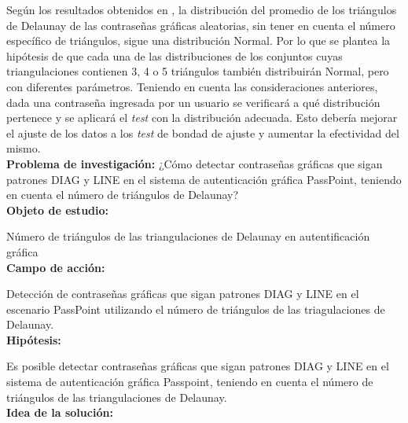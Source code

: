 \documentclass[12pt]{report}
\begin{document}
	
	Según los resultados obtenidos en \cite{13}, la distribución del promedio de los triángulos de  Delaunay de las contraseñas gráficas aleatorias, sin tener en cuenta el número específico de triángulos, sigue una distribución Normal. Por lo que se plantea la hipótesis de que cada una de las distribuciones de los conjuntos cuyas triangulaciones contienen 3, 4 o 5 triángulos también distribuirán Normal, pero con diferentes parámetros. Teniendo en cuenta las consideraciones anteriores, dada una contraseña ingresada por un usuario se verificará a qué distribución pertenece y se aplicará el \textit{test} con la distribución adecuada. Esto debería mejorar el ajuste de los datos a los \textit{test} de bondad de ajuste y aumentar la efectividad del mismo.\\
	
\large{\textbf{Problema de investigación:}}	
\normalsize{¿Cómo  detectar contraseñas gráficas que sigan patrones DIAG y LINE  en el sistema de autenticación gráfica PassPoint, teniendo en cuenta el número de triángulos de Delaunay?}\\
	
	\large{\textbf{Objeto de estudio:}}
	
	\normalsize{Número de triángulos de las  triangulaciones de Delaunay  en autentificación gráfica}\\
	
		   
	\large{\textbf{Campo de acción:}}
	
	\normalsize{Detección de contraseñas gráficas que sigan patrones DIAG y LINE en el escenario PassPoint   utilizando  el número de triángulos de las triagulaciones de Delaunay}.\\
	 
	\large{\textbf{Hipótesis:}}

	\normalsize{Es posible detectar contraseñas gráficas que sigan patrones DIAG y LINE en el sistema de autenticación gráfica Passpoint, teniendo en cuenta el número de triángulos  de las triangulaciones de Delaunay}.\\
		
	
	\large{\textbf{Idea de la solución:}}
	
\end{document}
